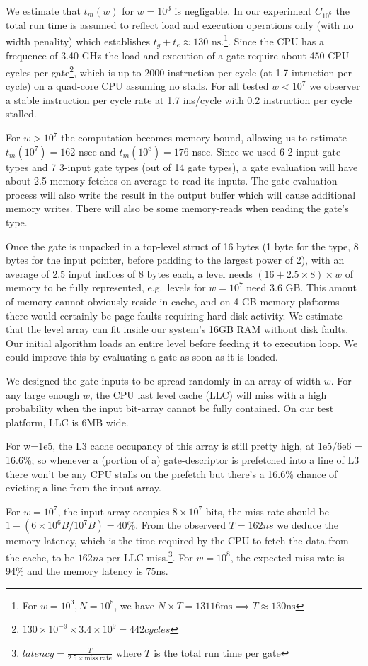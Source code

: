 We estimate that $t_m(w)$ for $w = 10^3$ is negligable. In our experiment $C_{10^6}$ the total run time is assumed to reflect load and execution operations only (with no width penality) which establishes $t_g + t_e \approx 130\text{ ns}$.\footnote{ For $w = 10^3, N=10^8$, we have $N \times T = 13116 \text{ms} \implies T \approx 130 \text{ns}$ }. 
Since the CPU has a frequence of 3.40 GHz the load and execution of a gate require about 450 CPU cycles per gate\footnote{$130 \times 10^{-9} \times 3.4 \times 10^9 = 442 cycles$}, which is up to 2000 instruction per cycle (at 1.7 intruction per cycle) on a quad-core CPU assuming no stalls. For all tested $w < 10^7$ we observer a stable instruction per cycle rate at 1.7 ins/cycle with 0.2 instruction per cycle stalled.
\par
For $ w > 10^7$ the computation becomes memory-bound, allowing us to estimate $t_m(10^7) = 162$ nsec and $t_m(10^8) = 176$ nsec. Since we used 6 2-input gate types and 7 3-input gate types (out of 14 gate types), a gate evaluation will have about 2.5 memory-fetches on average to read its inputs. The gate evaluation process will also write the result in the output buffer which will cause additional memory writes. There will also be some memory-reads when reading the gate's type.
\par
Once the gate is unpacked in a top-level struct of 16 bytes (1 byte for the type, 8 bytes for the input pointer, before padding to the largest power of 2), with an average of 2.5 input indices of 8 bytes each, a level needs $ (16 + 2.5 \times 8) \times w $ of memory to be fully represented, e.g.\ levels for $w = 10^7$ need 3.6 GB. This amout of memory cannot obviously reside in cache, and on 4 GB memory plaftorms there would certainly be page-faults requiring hard disk activity. We estimate that the level array can fit inside our system's 16GB RAM without disk faults. Our initial algorithm loads an entire level before feeding it to execution loop. We could improve this by evaluating a gate as soon as it is loaded.  
\par
We designed the gate inputs to be spread randomly in an array of width $w$. For any large enough $w$, the CPU last level cache (LLC) will miss with a high probability when the input bit-array cannot be fully contained. On our test platform, LLC is 6MB wide.
\par
For w=1e5, the L3 cache occupancy of this array is still pretty high, at 1e5/6e6 = 16.6\%; so whenever a (portion of a) gate-descriptor is prefetched into a line of L3 there won't be any CPU stalls on the prefetch but there's a 16.6\% chance of evicting a line from the input array.
\par
For $w = 10^7$, the input array occupies $8 \times 10^7$ bits, the miss rate should be $1 - (6\times10^6B/10^7B) = 40\%$. From the observerd $T = 162ns$ we deduce the memory latency, which is the time required by the CPU to fetch the data from the cache, to be $162ns$ per LLC miss.\footnote{ $latency = \frac{T}{2.5 \times \text{miss rate}}$ where $T$ is the total run time per gate}. For $w = 10^8$, the expected miss rate is 94\% and the memory latency is 75ns. 





